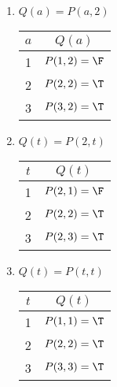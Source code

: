 \begin{solutions}
			\begin{enumerate}
			\item $Q(a) = P(a,2)$
				
						\begin{table}[h!]
						\begin{center}
							\begin{tabular}{c|c}
								
								$a$ & $Q(a)$ \\
								\hline
								1 & $P(1,2) = \F$ \\ 
								2 & $P(2,2) = \T$ \\
								3 & $P(3,2) = \T$ \\
							\end{tabular}
						\end{center}
					\end{table}
			\item $Q(t) = P(2,t)$
			
									\begin{table}[h!]
				\begin{center}
					\begin{tabular}{c|c}
						
						$t$ & $Q(t)$ \\
						\hline
						1 & $P(2,1) = \F$ \\ 
						2 & $P(2,2) = \T$ \\
						3 & $P(2,3) = \T$ \\
					\end{tabular}
				\end{center}
			\end{table}
		
			\item $Q(t) = P(t,t)$
			
									\begin{table}[h!]
				\begin{center}
					\begin{tabular}{c|c}
						
						$t$ & $Q(t)$ \\
						\hline
						1 & $P(1,1) = \T$ \\ 
						2 & $P(2,2) = \T$ \\
						3 & $P(3,3) = \T$ \\
					\end{tabular}
				\end{center}
			\end{table}
		

\end{enumerate}
\end{solutions}
